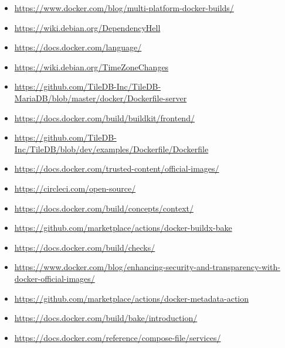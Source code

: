 \documentclass{article}
\begin{document}
\begin{itemize}
  \item \href{https://www.docker.com/blog/multi-platform-docker-builds/}{https://www.docker.com/blog/multi-platform-docker-builds/}
  \item \href{https://wiki.debian.org/DependencyHell}{https://wiki.debian.org/DependencyHell}
  \item \href{https://docs.docker.com/language/}{https://docs.docker.com/language/}
  \item \href{https://wiki.debian.org/TimeZoneChanges}{https://wiki.debian.org/TimeZoneChanges}
  \item \href{https://github.com/TileDB-Inc/TileDB-MariaDB/blob/master/docker/Dockerfile-server}{https://github.com/TileDB-Inc/TileDB-MariaDB/blob/master/docker/Dockerfile-server}
  \item \href{https://docs.docker.com/build/buildkit/frontend/}{https://docs.docker.com/build/buildkit/frontend/}
  \item \href{https://github.com/TileDB-Inc/TileDB/blob/dev/examples/Dockerfile/Dockerfile}{https://github.com/TileDB-Inc/TileDB/blob/dev/examples/Dockerfile/Dockerfile}
  \item \href{https://docs.docker.com/trusted-content/official-images/}{https://docs.docker.com/trusted-content/official-images/}
  \item \href{https://circleci.com/open-source/}{https://circleci.com/open-source/}
  \item \href{https://docs.docker.com/build/concepts/context/}{https://docs.docker.com/build/concepts/context/}
  \item \href{https://github.com/marketplace/actions/docker-buildx-bake}{https://github.com/marketplace/actions/docker-buildx-bake}
  \item \href{https://docs.docker.com/build/checks/}{https://docs.docker.com/build/checks/}
  \item \href{https://www.docker.com/blog/enhancing-security-and-transparency-with-docker-official-images/}{https://www.docker.com/blog/enhancing-security-and-transparency-with-docker-official-images/}
  \item \href{https://github.com/marketplace/actions/docker-metadata-action}{https://github.com/marketplace/actions/docker-metadata-action}
  \item \href{https://docs.docker.com/build/bake/introduction/}{https://docs.docker.com/build/bake/introduction/}
  \item \href{https://docs.docker.com/reference/compose-file/services/}{https://docs.docker.com/reference/compose-file/services/}

\end{itemize}
\end{document}
